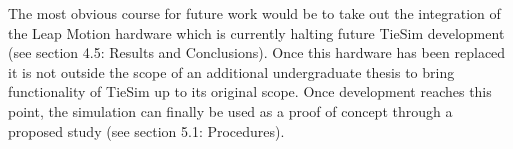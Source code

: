 The most obvious course for future work would be to take out the integration of the Leap Motion hardware which is currently halting future TieSim development (see section 4.5: Results and Conclusions). Once this hardware has been replaced it is not outside the scope of an additional undergraduate thesis to bring functionality of TieSim up to its original scope. Once development reaches this point, the simulation can finally be used as a proof of concept through a proposed study (see section 5.1: Procedures). 

%
%
